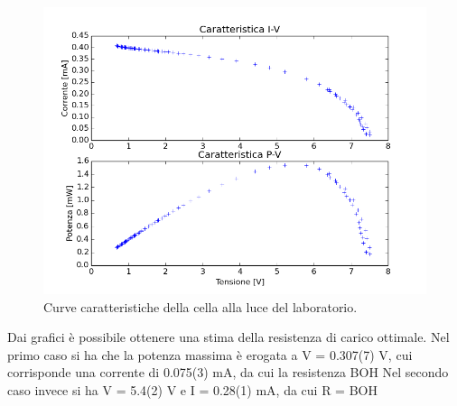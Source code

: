 \documentclass[journal, a4paper]{IEEEtran}
\begin{document}
\begin{figure}[htp]
\centering
\includegraphics[scale=.45]{es4_luceled}
\caption{Curve caratteristiche della cella alla luce del laboratorio.}
\label{fig:led}
\end{figure}

Dai grafici è possibile ottenere una stima della resistenza di carico ottimale. Nel primo caso si ha che la potenza massima è erogata a V = 0.307(7) V, cui corrisponde una corrente di 0.075(3) mA, da cui la resistenza BOH
Nel secondo caso invece si ha V = 5.4(2) V e I = 0.28(1) mA, da cui R = BOH

\end{document}
